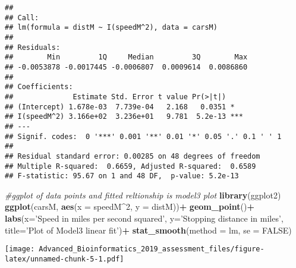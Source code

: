 \documentclass[]{article}
\newenvironment{Shaded}{\begin{snugshade}}{\end{snugshade}}
\newcommand{\KeywordTok}[1]{\textcolor[rgb]{0.13,0.29,0.53}{\textbf{#1}}}
\newcommand{\DataTypeTok}[1]{\textcolor[rgb]{0.13,0.29,0.53}{#1}}
\newcommand{\DecValTok}[1]{\textcolor[rgb]{0.00,0.00,0.81}{#1}}
\newcommand{\StringTok}[1]{\textcolor[rgb]{0.31,0.60,0.02}{#1}}
\newcommand{\CommentTok}[1]{\textcolor[rgb]{0.56,0.35,0.01}{\textit{#1}}}
\newcommand{\OtherTok}[1]{\textcolor[rgb]{0.56,0.35,0.01}{#1}}
\newcommand{\OperatorTok}[1]{\textcolor[rgb]{0.81,0.36,0.00}{\textbf{#1}}}
\newcommand{\NormalTok}[1]{#1}
\begin{document}
\begin{verbatim}
## 
## Call:
## lm(formula = distM ~ I(speedM^2), data = carsM)
## 
## Residuals:
##        Min         1Q     Median         3Q        Max 
## -0.0053878 -0.0017445 -0.0006807  0.0009614  0.0086860 
## 
## Coefficients:
##              Estimate Std. Error t value Pr(>|t|)    
## (Intercept) 1.678e-03  7.739e-04   2.168   0.0351 *  
## I(speedM^2) 3.166e+02  3.236e+01   9.781  5.2e-13 ***
## ---
## Signif. codes:  0 '***' 0.001 '**' 0.01 '*' 0.05 '.' 0.1 ' ' 1
## 
## Residual standard error: 0.00285 on 48 degrees of freedom
## Multiple R-squared:  0.6659, Adjusted R-squared:  0.6589 
## F-statistic: 95.67 on 1 and 48 DF,  p-value: 5.2e-13
\end{verbatim}

\begin{Shaded}
\begin{Highlighting}[]
\CommentTok{#ggplot of data points and fitted reltionship is model3 plot}
\KeywordTok{library}\NormalTok{(ggplot2)}
\KeywordTok{ggplot}\NormalTok{(carsM, }\KeywordTok{aes}\NormalTok{(}\DataTypeTok{x =}\NormalTok{ speedM}\OperatorTok{^}\DecValTok{2}\NormalTok{, }\DataTypeTok{y =}\NormalTok{ distM))}\OperatorTok{+}
\StringTok{  }\KeywordTok{geom_point}\NormalTok{()}\OperatorTok{+}
\StringTok{  }\KeywordTok{labs}\NormalTok{(}\DataTypeTok{x=}\StringTok{'Speed in miles per second squared'}\NormalTok{, }\DataTypeTok{y=}\StringTok{'Stopping distance in miles'}\NormalTok{, }\DataTypeTok{title=}\StringTok{'Plot of Model3 linear fit'}\NormalTok{)}\OperatorTok{+}
\StringTok{  }\KeywordTok{stat_smooth}\NormalTok{(}\DataTypeTok{method =}\NormalTok{ lm, }\DataTypeTok{se =} \OtherTok{FALSE}\NormalTok{)}
\end{Highlighting}
\end{Shaded}

\texttt{[image: Advanced\_Bioinformatics\_2019\_assessment\_files/figure-latex/unnamed-chunk-5-1.pdf]}
\end{document}
